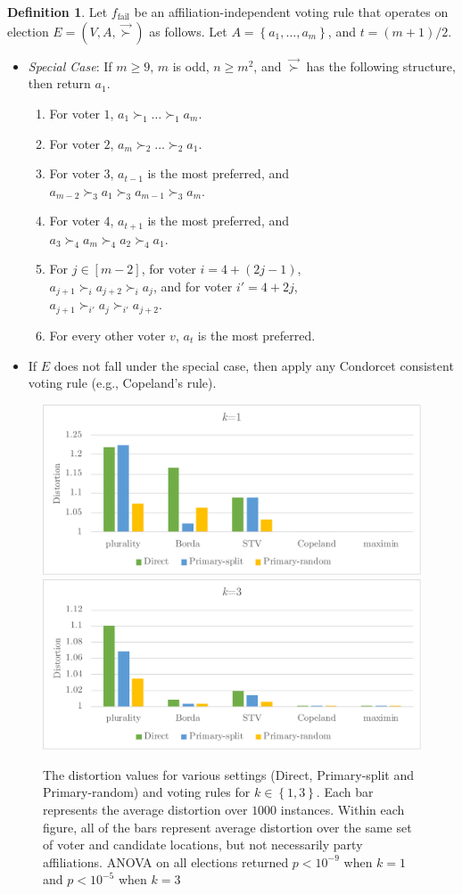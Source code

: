 \documentclass[letterpaper]{article} %
\theoremstyle{definition}
\newtheorem{definition}{Definition}
\newcommand{\set}[1]{\left\{#1\right\}}
\renewcommand{\vec}{\overrightarrow}
\newcommand{\vsucc}{\vec{\succ}}
\newcommand{\fail}{{\textrm{fail}}}
\begin{document}
\begin{definition}
	Let $f_\fail$ be an affiliation-independent voting rule that operates on election $E = (V,A,\vsucc)$ as follows. Let $A = \set{a_1,\ldots,a_m}$, and $t = (m+1)/2$. 
\begin{itemize}
	\item \emph{Special Case}: If $m \ge 9$, $m$ is odd, $n \ge m^2$, and $\vsucc$ has the following structure, then return $a_1$.
	\begin{enumerate}
		\item For voter $1$, $a_1 \succ_1 \ldots \succ_1 a_m$.
		\item For voter $2$, $a_m \succ_2 \ldots \succ_2 a_1$.
		\item For voter $3$, $a_{t-1}$ is the most preferred, and \\ $a_{m-2} \succ_3 a_1 \succ_3 a_{m-1} \succ_3 a_m$.
		\item For voter $4$, $a_{t+1}$ is the most preferred, and \\ $a_3 \succ_4 a_m \succ_4 a_2 \succ_4 a_1$.
		\item For $j \in [m-2]$, for voter $i = 4+(2j-1)$, \\ $a_{j+1} \succ_i a_{j+2} \succ_i a_j$, and for voter $i' = 4+2j$, \\ $a_{j+1} \succ_{i'} a_j \succ_{i'} a_{j+2}$.
		\item For every other voter $v$, $a_t$ is the most preferred.
			\end{enumerate}
	
	\item If $E$ does not fall under the special case, then apply any Condorcet consistent voting rule (e.g., Copeland's rule).
\end{itemize}
\end{definition}
\begin{figure}
\centering
\includegraphics[width=0.47\linewidth]{distortion_1.pdf}
\hspace{0.05\linewidth}
\includegraphics[width=0.47\linewidth]{distortion_3.pdf}
\caption {The distortion values for various settings (Direct, Primary-split and Primary-random) and voting rules for $k \in \set{1,3}$. Each bar represents the average distortion over $1000$ instances. Within each figure, all of the bars represent average distortion over the same set of voter and candidate locations, but not necessarily party affiliations. ANOVA on all elections returned $p<10^{-9}$ when $k=1$ and $p<10^{-5}$ when $k=3$}
\label{distortions}
\end{figure}
\end{document}
